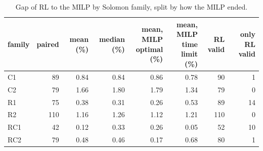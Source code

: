 \begin{table}[H]\centering
\small
\caption{Gap of RL to the MILP by Solomon family, split by how the MILP ended.}\label{tab:gapfam}
\begin{adjustbox}{max width=\textwidth}\begin{tabular}{lrrrrrrr}\toprule
family & paired & mean (\%) & median (\%) & \shortstack{mean, MILP\\optimal (\%)} & \shortstack{mean, MILP\\time limit (\%)} & RL valid & only RL valid \\ \midrule
C1 & 89 & 0.84 & 0.84 & 0.86 & 0.78 & 90 & 1 \\
C2 & 79 & 1.66 & 1.80 & 1.79 & 1.34 & 79 & 0 \\
R1 & 75 & 0.38 & 0.31 & 0.26 & 0.53 & 89 & 14 \\
R2 & 110 & 1.16 & 1.26 & 1.12 & 1.21 & 110 & 0 \\
RC1 & 42 & 0.12 & 0.33 & 0.26 & 0.05 & 52 & 10 \\
RC2 & 79 & 0.48 & 0.46 & 0.17 & 0.68 & 80 & 1 \\
\bottomrule\end{tabular}\end{adjustbox}\end{table}
